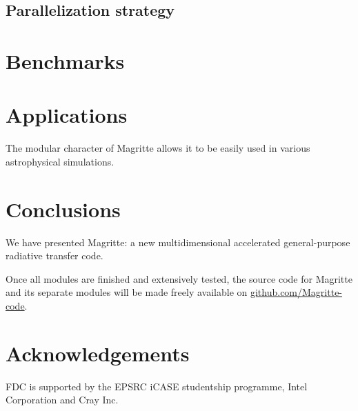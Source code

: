 \documentclass[a4paper,fleqn,usenatbib]{mnras}
\begin{document}
\subsection{Parallelization strategy}

\section{Benchmarks}
\label{Benchmarks}



\section{Applications}
\label{Applications}
The modular character of Magritte allows it to be easily used in various astrophysical simulations.


\section{Conclusions}
\label{Conclusions}
We have presented Magritte: a new multidimensional accelerated general-purpose radiative transfer code.

\bigskip

Once all modules are finished and extensively tested, the source code for Magritte and its separate modules will be made freely available on \href{https://github.com/Magritte-code}{github.com/Magritte-code}.


\section*{Acknowledgements}
FDC is supported by the EPSRC iCASE studentship programme, Intel Corporation and Cray Inc.








\bsp	%
\label{lastpage}
\end{document}
